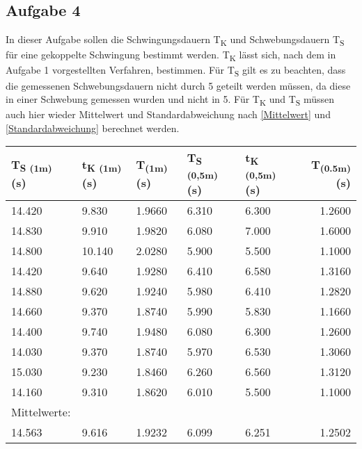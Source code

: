 \documentclass[titlepage=firstcover, captions=tableheading]{scrartcl}
\begin{document}
\subsection{Aufgabe 4}

In dieser Aufgabe sollen die Schwingungsdauern T\textsubscript{K} und Schwebungsdauern T\textsubscript{S} für eine gekoppelte Schwingung bestimmt werden.
T\textsubscript{K} lässt sich, nach dem in Aufgabe 1 vorgestellten Verfahren, bestimmen.
Für T\textsubscript{S} gilt es zu beachten, dass die gemessenen Schwebungsdauern nicht durch 5 geteilt werden müssen, da diese in einer Schwebung gemessen wurden und nicht in 5.
Für T\textsubscript{K} und T\textsubscript{S} müssen auch hier wieder Mittelwert und Standardabweichung nach \ref{Mittelwert} und \ref{Standardabweichung} berechnet werden.

\begin{minipage}{\linewidth}
    \centering
    \begin{tabular}{lllllr}
        \toprule 
        T\textsubscript{S (1m)} (s) & 
        t\textsubscript{K (1m)} (s) &
        T\textsubscript{(1m)} (s) & 
        T\textsubscript{S (0,5m)} (s) &
        t\textsubscript{K (0,5m)} (s) &
        T\textsubscript{(0.5m)} (s)\\
        \midrule
        14.420 &  9.830 & 1.9660 & 6.310 & 6.300 & 1.2600 \\
        14.830 &  9.910 & 1.9820 & 6.080 & 7.000 & 1.6000 \\
        14.800 & 10.140 & 2.0280 & 5.900 & 5.500 & 1.1000 \\
        14.420 &  9.640 & 1.9280 & 6.410 & 6.580 & 1.3160 \\
        14.880 &  9.620 & 1.9240 & 5.980 & 6.410 & 1.2820 \\
        14.660 &  9.370 & 1.8740 & 5.990 & 5.830 & 1.1660 \\
        14.400 &  9.740 & 1.9480 & 6.080 & 6.300 & 1.2600 \\
        14.030 &  9.370 & 1.8740 & 5.970 & 6.530 & 1.3060 \\
        15.030 &  9.230 & 1.8460 & 6.260 & 6.560 & 1.3120 \\
        14.160 &  9.310 & 1.8620 & 6.010 & 5.500 & 1.1000 \\
        \midrule
        Mittelwerte:\\
        14.563 & 9.616 & 1.9232 & 6.099 & 6.251 & 1.2502\\
        
        \bottomrule
        
    \end{tabular}
    \label{tab:4}
\end{minipage}
\end{document}
